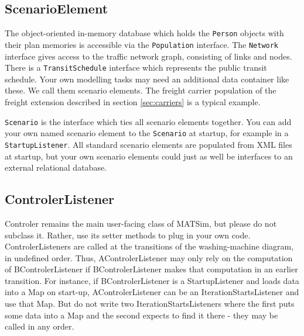 \subsection{ScenarioElement}

The object-oriented in-memory database which holds the \lstinline$Person$ objects with their plan memories is accessible via the
\lstinline$Population$ interface. The \lstinline$Network$ interface gives access to the traffic network graph, consisting of links and nodes.
There is a \lstinline$TransitSchedule$ interface which represents the public transit schedule. Your own modelling tasks may need an additional data container
like these. We call them scenario elements. The freight carrier population of the freight extension described in section \ref{sec:carriers} is a typical example. 

\lstinline$Scenario$ is the interface which ties all scenario elements together. You can add your own named scenario element
to the \lstinline$Scenario$ at startup, for example in a \lstinline$StartupListener$. All standard scenario elements are populated
from XML files at startup, but your own scenario elements could just as well be interfaces to an external relational database.


\subsection{ControlerListener}
\label{sec:controlerListener-extension-point}
\label{sec:controlerextension}
Controler remains the main user-facing class of MATSim, but please do not subclass it. Rather,
use its setter methods to plug in your own code.
ControlerListeners are called at the transitions of the washing-machine diagram, in undefined order.
Thus, AControlerListener may only rely on the computation of BControlerListener if BControlerListener
 makes that computation in an earlier transition. For instance, if BControlerListener is a StartupListener
 and loads data into a Map on start-up, AControlerListener can be an IterationStartsListener and use that Map.
 But do not write two IterationStartsListeners where the first puts some data into a Map and the second expects
 to find it there - they may be called in any order.

